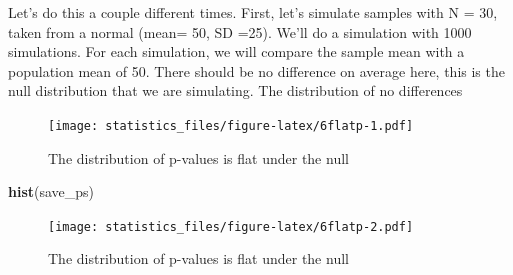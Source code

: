 \documentclass[]{book}
\newenvironment{Shaded}{\begin{snugshade}}{\end{snugshade}}
\newcommand{\CommentTok}[1]{\textcolor[rgb]{0.56,0.35,0.01}{\textit{#1}}}
\newcommand{\ControlFlowTok}[1]{\textcolor[rgb]{0.13,0.29,0.53}{\textbf{#1}}}
\newcommand{\DataTypeTok}[1]{\textcolor[rgb]{0.13,0.29,0.53}{#1}}
\newcommand{\DecValTok}[1]{\textcolor[rgb]{0.00,0.00,0.81}{#1}}
\newcommand{\KeywordTok}[1]{\textcolor[rgb]{0.13,0.29,0.53}{\textbf{#1}}}
\newcommand{\NormalTok}[1]{#1}
\newcommand{\OperatorTok}[1]{\textcolor[rgb]{0.81,0.36,0.00}{\textbf{#1}}}
\newcommand{\StringTok}[1]{\textcolor[rgb]{0.31,0.60,0.02}{#1}}
\begin{document}
Let's do this a couple different times. First, let's simulate samples with N = 30, taken from a normal (mean= 50, SD =25). We'll do a simulation with 1000 simulations. For each simulation, we will compare the sample mean with a population mean of 50. There should be no difference on average here, this is the null distribution that we are simulating. The distribution of no differences

\begin{Shaded}
\end{Shaded}

\begin{figure}
\centering
\texttt{[image: statistics\_files/figure-latex/6flatp-1.pdf]}
\caption{\label{fig:6flatp1}The distribution of p-values is flat under the null}
\end{figure}

\begin{Shaded}
\begin{Highlighting}[]
\KeywordTok{hist}\NormalTok{(save_ps)}
\end{Highlighting}
\end{Shaded}

\begin{figure}
\centering
\texttt{[image: statistics\_files/figure-latex/6flatp-2.pdf]}
\caption{\label{fig:6flatp2}The distribution of p-values is flat under the null}
\end{figure}
\end{document}
